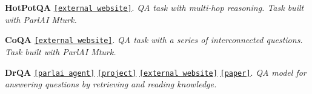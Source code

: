 \begin{DoxyItemize}
\item {\bfseries Hot\+Pot\+QA} \href{https://hotpotqa.github.io/}{\tt \mbox{[}external website\mbox{]}}. {\itshape QA task with multi-\/hop reasoning. Task built with Parl\+AI Mturk.}
\item {\bfseries Co\+QA} \href{https://stanfordnlp.github.io/coqa/}{\tt \mbox{[}external website\mbox{]}}. {\itshape QA task with a series of interconnected questions. Task built with Parl\+AI Mturk.}
\item {\bfseries Dr\+QA} \href{https://github.com/facebookresearch/ParlAI/tree/master/parlai/agents/drqa}{\tt \mbox{[}parlai agent\mbox{]}} \href{https://github.com/facebookresearch/ParlAI/tree/master/projects/drqa}{\tt \mbox{[}project\mbox{]}} \href{https://github.com/facebookresearch/DrQA}{\tt \mbox{[}external website\mbox{]}} \href{https://arxiv.org/abs/1704.00051}{\tt \mbox{[}paper\mbox{]}}. {\itshape QA model for answering questions by retrieving and reading knowledge.} 
\end{DoxyItemize}